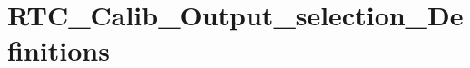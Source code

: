 \hypertarget{group___r_t_c___calib___output__selection___definitions}{\section{R\-T\-C\-\_\-\-Calib\-\_\-\-Output\-\_\-selection\-\_\-\-Definitions}
\label{group___r_t_c___calib___output__selection___definitions}
}
